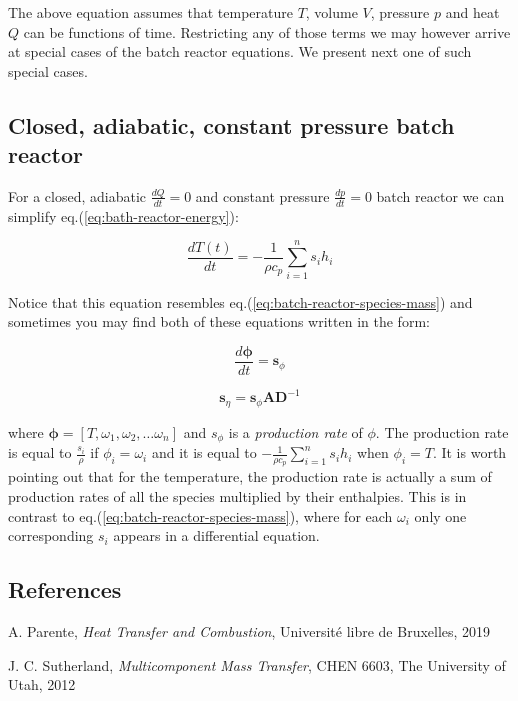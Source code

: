 \documentclass[10pt]{article}
\begin{document}
The above equation assumes that temperature $T$, volume $V$, pressure $p$ and heat $Q$ can be functions of time. Restricting any of those terms we may however arrive at special cases of the batch reactor equations. We present next one of such special cases.


\newpage

\subsection{Closed, adiabatic, constant pressure batch reactor}

For a closed, adiabatic $\frac{dQ}{dt} = 0$ and constant pressure $\frac{dp}{dt}= 0$ batch reactor we can simplify eq.(\ref{eq:bath-reactor-energy}):

\begin{equation} \label{eq:bath-reactor-adiabatic-constant-pressure}
 \frac{d T(t)}{dt}  = - \frac{1}{\rho c_{p}} \sum_{i=1}^n  s_i  h_i 
\end{equation}

Notice that this equation resembles eq.(\ref{eq:batch-reactor-species-mass}) and sometimes you may find both of these equations written in the form:

\begin{equation} \label{eq:bath-reactor-adiabatic-constant-pressure}
 \frac{d \boldsymbol{\phi}}{dt}  = \mathbf{s}_{\phi}
\end{equation}

\begin{equation} \label{eq:bath-reactor-adiabatic-constant-pressure}
\mathbf{s}_{\eta} = \mathbf{s}_{\phi} \mathbf{A} \mathbf{D}^{-1}
\end{equation}


where $ \boldsymbol{\phi} = [T, \omega_1, \omega_2, \dots \omega_n]$ and $s_{\phi}$ is a \textit{production rate} of $\phi$. The production rate is equal to $\frac{s_i}{\rho}$ if $\phi_i = \omega_i$ and it is equal to $ - \frac{1}{\rho c_{p}} \sum_{i=1}^n  s_i  h_i $ when $\phi_i = T$. It is worth pointing out that for the temperature, the production rate is actually a sum of production rates of all the species multiplied by their enthalpies. This is in contrast to eq.(\ref{eq:batch-reactor-species-mass}), where for each $\omega_i$ only one corresponding $s_i$ appears in a differential equation.







\subsection*{References}

A. Parente, \textit{Heat Transfer and Combustion}, Université libre de Bruxelles, 2019

J. C. Sutherland, \textit{Multicomponent Mass Transfer}, CHEN 6603, The University of Utah, 2012
\end{document}
